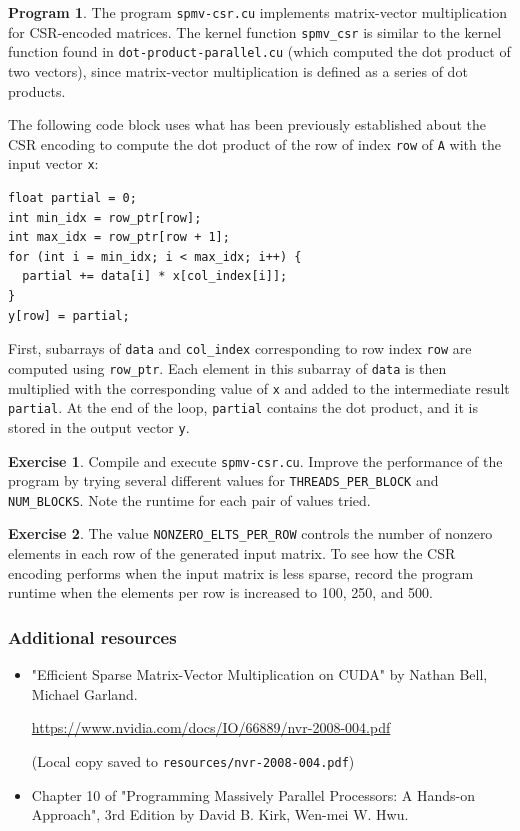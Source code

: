 \documentclass{article}
\newcommand{\resource}[1]{(Local copy saved to \texttt{#1})}
\theoremstyle{definition}
\newtheorem{program}{Program}
\newtheorem{exercise}{Exercise}
\begin{document}
\begin{program}
The program \texttt{spmv-csr.cu} implements matrix-vector multiplication for CSR-encoded matrices. The kernel function \texttt{spmv\_csr} is similar to the kernel function found in \texttt{dot-product-parallel.cu} (which computed the dot product of two vectors), since matrix-vector multiplication is defined as a series of dot products.

The following code block uses what has been previously established about the CSR encoding to compute the dot product of the row of index \texttt{row} of \texttt{A} with the input vector \texttt{x}:

\begin{verbatim}
float partial = 0;
int min_idx = row_ptr[row];
int max_idx = row_ptr[row + 1];
for (int i = min_idx; i < max_idx; i++) {
  partial += data[i] * x[col_index[i]];
}    
y[row] = partial;
\end{verbatim}

First, subarrays of \texttt{data} and \texttt{col\_index} corresponding to row index \texttt{row} are computed using \texttt{row\_ptr}. Each element in this subarray of \texttt{data} is then multiplied with the corresponding value of \texttt{x} and added to the intermediate result \texttt{partial}. At the end of the loop, \texttt{partial} contains the dot product, and it is stored in the output vector \texttt{y}.
\end{program}

\begin{exercise}
Compile and execute \texttt{spmv-csr.cu}. Improve the performance of the program by trying several different values for \texttt{THREADS\_PER\_BLOCK} and \texttt{NUM\_BLOCKS}. Note the runtime for each pair of values tried.
\end{exercise}

\begin{exercise}
The value \texttt{NONZERO\_ELTS\_PER\_ROW} controls the number of nonzero elements in each row of the generated input matrix. To see how the CSR encoding performs when the input matrix is less sparse, record the program runtime when the elements per row is increased to 100, 250, and 500.
\end{exercise}

\subsubsection*{Additional resources}
\begin{itemize}
    \item "Efficient Sparse Matrix-Vector Multiplication on CUDA" by Nathan Bell, Michael Garland.
    
    \url{https://www.nvidia.com/docs/IO/66889/nvr-2008-004.pdf}
    
    \resource{resources/nvr-2008-004.pdf}
    
    \item Chapter 10 of "Programming Massively Parallel Processors: A Hands-on Approach", 3rd Edition by David B. Kirk, Wen-mei W. Hwu.

\end{itemize}
\end{document}
